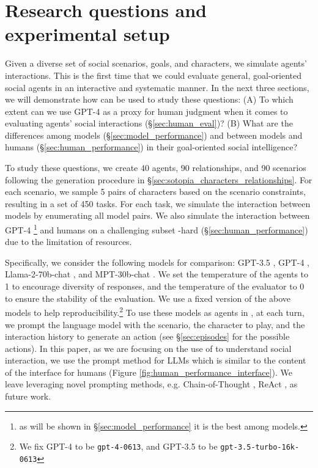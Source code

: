 
\section{Research questions and experimental setup}
\label{sec:simulation}
Given a diverse set of social scenarios, goals, and characters, we simulate agents' interactions. This is the first time that we could evaluate general, goal-oriented social agents in an interactive and systematic manner.
In the next three sections, we will demonstrate how \sotopia can be used to study these questions: (A) To which extent can we use GPT-4 \citep{openai2023gpt4} as a proxy for human judgment when it comes to evaluating agents' social interactions (\S\ref{sec:human_eval})? (B) What are the differences among models (\S\ref{sec:model_performance}) and between models and humans (\S\ref{sec:human_performance}) in their goal-oriented social intelligence? 

To study these questions, we create 40 agents, 90 relationships, and 90 scenarios following the generation procedure in \S\ref{sec:sotopia_characters_relationships}.
For each scenario, we sample 5 pairs of characters based on the scenario constraints, resulting in a set of 450 tasks.
For each task, we simulate the interaction between models by enumerating all model pairs. 
We also simulate the interaction between GPT-4 \citep{openai2023gpt4}\footnote{as will be shown in \S\ref{sec:model_performance} it is the best among models.} and humans on a challenging subset \sotopia-hard (\S\ref{sec:human_performance}) due to the limitation of resources. 

Specifically, we consider the following models for comparison: GPT-3.5 \citep{ouyang2022training}, GPT-4 \citep{openai2023gpt4}, Llama-2-70b-chat \citep{touvron2023llama}, and MPT-30b-chat \citep{MosaicML2023}. 
We set the temperature of the agents to 1 to encourage diversity of responses, and the temperature of the evaluator to 0 to ensure the stability of the evaluation. We use a fixed version of the above models to help reproducibility.\footnote{We fix GPT-4 to be \texttt{gpt-4-0613}, and GPT-3.5 to be \texttt{gpt-3.5-turbo-16k-0613}}
To use these models as agents in \sotopia, at each turn, we prompt the language model with the scenario, the character to play, and the interaction history to generate an action (see \S\ref{sec:episodes} for the possible actions). In this paper, as we are focusing on the use of \sotopia to understand social interaction, we use the prompt method for LLMs which is similar to the content of the interface for humans (Figure \ref{fig:human_performance_interface}). We leave leveraging novel prompting methods, e.g. Chain-of-Thought \citep{wei2022chain}, ReAct \citep{yao2022react}, as future work. 










